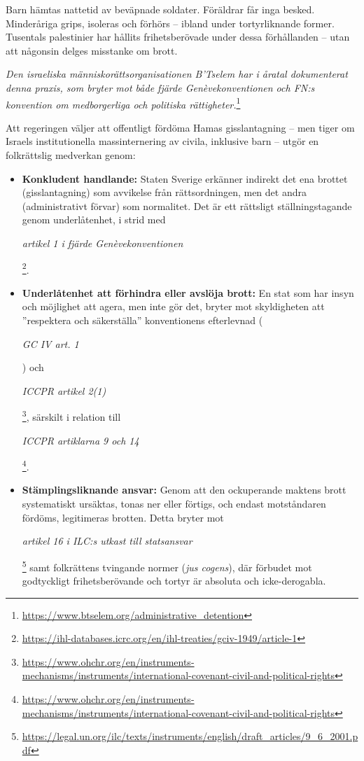 \documentclass[12pt]{article}
\newcommand{\lagrum}[1]{\par\vspace{3mm}\textit{#1}\par\vspace{5mm}}
\begin{document}
Barn hämtas nattetid av beväpnade soldater. Föräldrar får inga besked. Minderåriga grips, isoleras och förhörs – ibland under tortyrliknande former. Tusentals palestinier har hållits frihetsberövade under dessa förhållanden – utan att någonsin delges misstanke om brott.

\textit{Den israeliska människorättsorganisationen B’Tselem har i åratal dokumenterat denna praxis, som bryter mot både fjärde Genèvekonventionen och FN:s konvention om medborgerliga och politiska rättigheter.}\footnote{\url{https://www.btselem.org/administrative_detention}}

Att regeringen väljer att offentligt fördöma Hamas gisslantagning – men tiger om Israels institutionella massinternering av civila, inklusive barn – utgör en folkrättslig medverkan genom:

\begin{itemize}
  \item \textbf{Konkludent handlande:} Staten Sverige erkänner indirekt det ena brottet (gisslantagning) som avvikelse från rättsordningen, men det andra (administrativt förvar) som normalitet. Det är ett rättsligt ställningstagande genom underlåtenhet, i strid med \lagrum{artikel 1 i fjärde Genèvekonventionen}\footnote{\url{https://ihl-databases.icrc.org/en/ihl-treaties/gciv-1949/article-1}}.

  \item \textbf{Underlåtenhet att förhindra eller avslöja brott:} En stat som har insyn och möjlighet att agera, men inte gör det, bryter mot skyldigheten att ”respektera och säkerställa” konventionens efterlevnad (\lagrum{GC IV art. 1}) och \lagrum{ICCPR artikel 2(1)}\footnote{\url{https://www.ohchr.org/en/instruments-mechanisms/instruments/international-covenant-civil-and-political-rights}}, särskilt i relation till \lagrum{ICCPR artiklarna 9 och 14}\footnote{\url{https://www.ohchr.org/en/instruments-mechanisms/instruments/international-covenant-civil-and-political-rights}}.

  \item \textbf{Stämplingsliknande ansvar:} Genom att den ockuperande maktens brott systematiskt ursäktas, tonas ner eller förtigs, och endast motståndaren fördöms, legitimeras brotten. Detta bryter mot \lagrum{artikel 16 i ILC:s utkast till statsansvar}\footnote{\url{https://legal.un.org/ilc/texts/instruments/english/draft_articles/9_6_2001.pdf}} samt folkrättens tvingande normer (\textit{jus cogens}), där förbudet mot godtyckligt frihetsberövande och tortyr är absoluta och icke-derogabla.
\end{itemize}
\end{document}
